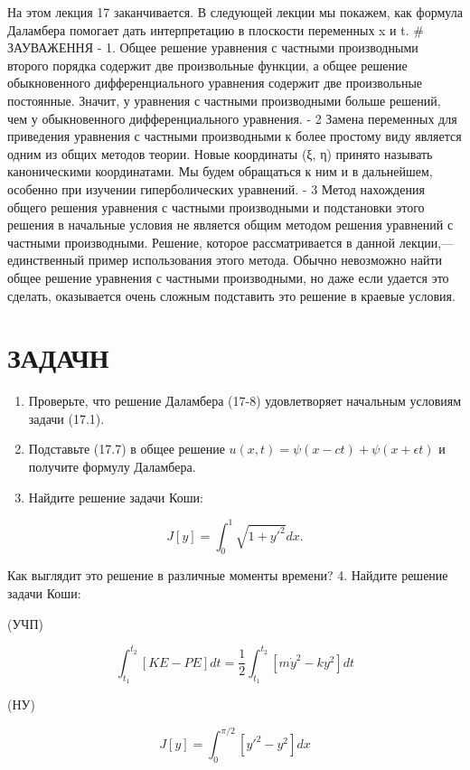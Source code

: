 \documentclass[
  ukrainian,
]{article}
\begin{document}
На этом лекция 17 заканчивается. В следующей лекции мы покажем, как
формула Даламбера помогает дать интерпретацию в плоскости переменных x и
t. \# ЗАУВАЖЕННЯ - 1. Общее решение уравнения с частными производными
второго порядка содержит две произвольные функции, а общее решение
обыкновенного дифференциального уравнения содержит две произвольные
постоянные. Значит, у уравнения с частными производными больше решений,
чем у обыкновенного дифференциального уравнения. - 2 Замена переменных
для приведения уравнения с частными производными к более простому виду
является одним из общих методов теории. Новые координаты (ξ, η) принято
называть каноническими координатами. Мы будем обращаться к ним и в
дальнейшем, особенно при изучении гиперболических уравнений. - 3 Метод
нахождения общего решения уравнения с частными производными и
подстановки этого решения в начальные условия не является общим методом
решения уравнений с частными производными. Решение, которое
рассматривается в данной лекции,--- единственный пример использования
этого метода. Обычно невозможно найти общее решение уравнения с частными
производными, но даже если удается это сделать, оказывается очень
сложным подставить это решение в краевые условия.

\section{ЗАДАЧН}\label{ux437ux430ux434ux430ux447ux43d}

\begin{enumerate}
\def\labelenumi{\arabic{enumi}.}
\item
  Проверьте, что решение Даламбера (17-8) удовлетворяет начальным
  условиям задачи (17.1).
\item
  Подставьте (17.7) в общее решение
  \(u(x, t) = \psi(x - ct) + \psi(x + \epsilon t)\) и получите формулу
  Даламбера.
\item
  Найдите решение задачи Коши:
\end{enumerate}

\[
J[y] = \int_{0}^{1} \sqrt{1 + y'^{2}} dx.
\]

Как выглядит это решение в различные моменты времени? 4. Найдите решение
задачи Коши:

(УЧП)

\[
\int_{t_{1}}^{t_{2}} [KE - PE] dt = \frac{1}{2} \int_{t_{1}}^{t_{2}} [m\dot{y}^{2} - ky^{2}] dt
\]

(НУ)

\[
J[y] = \int_{0}^{\pi/2} [y'^{2} - y^{2}] dx
\]
\end{document}
